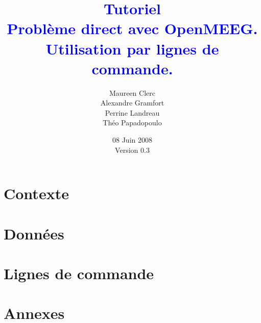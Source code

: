 \documentclass[11pt,a4paper,makeidx]{book}
\title{{\textbf{\textcolor{blue}{Tutoriel\\
        {\Large Problème direct avec OpenMEEG.\\
                Utilisation par lignes de commande.}}}}}
\author{Maureen Clerc\\Alexandre Gramfort \\
        Perrine Landreau\\Théo Papadopoulo}
\date{08 Juin 2008\\
      Version 0.3}
\begin{document}
    \maketitle
    \tableofcontents

    \chapter{Contexte}
    

    \chapter{Données}
    

    \chapter{Lignes de commande}
    

    \appendix
    \chapter{Annexes}
    
\end{document}

